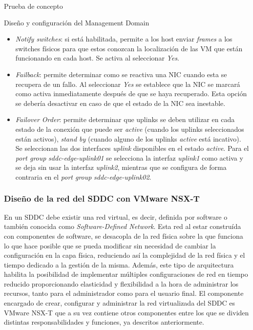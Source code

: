 \begin{section}{Prueba de concepto}
\begin{subsection}{Diseño y configuración del Management Domain}
\begin{itemize}
      \item \textit{Notify switches}: si está habilitada, permite a los host enviar \textit{frames} a los switches físicos para que estos conozcan la localización de las VM que están funcionando en cada host. Se activa al seleccionar \textit{Yes}.
      
      \item \textit{Failback}: permite determinar como se reactiva una NIC cuando esta se recupera de un fallo. Al seleccionar \textit{Yes} se establece que la NIC se marcará como activa inmediatamente después de que se haya recuperado. Esta opción se debería desactivar en caso de que el estado de la NIC sea inestable.
      
      \item \textit{Failover Order}: permite determinar que uplinks se deben utilizar en cada estado de la conexión que puede ser \textit{active} (cuando los uplinks seleccionados están activos), \textit{stand by} (cuando alguno de los uplinks \textit{active} está incativo). Se seleccionan las dos interfaces \textit{uplink} disponibles en el estado \textit{active}. Para el \textit{port group} \textit{sddc-edge-uplink01} se selecciona la interfaz \textit{uplink1} como activa y se deja sin usar la interfaz \textit{uplink2}, mientras que se configura de forma contraria en el \textit{port group} \textit{sddc-edge-uplink02}.
    \end{itemize}
    
    
    \subsubsection{Diseño de la red del SDDC con VMware NSX-T}
    En un SDDC debe existir una red virtual, es decir, definida por software o también conocida como \textit{Software-Defined Network}. Esta red al estar construída con componentes de software, se desacopla de la red física sobre la que funciona lo que hace posible que se pueda modificar sin necesidad de cambiar la configuración en la capa física, reduciendo así la complejidad de la red física y el tiempo dedicado a la gestión de la misma. Además, este tipo de arquitectura habilita la posibilidad de implementar múltiples configuraciones de red en tiempo reducido proporcionando elasticidad y flexibilidad a la hora de administrar los recursos, tanto para el administrador como para el usuario final.
    El componente encargado de crear, configurar y administrar la red virtualizada del SDDC es VMware NSX-T que a su vez contiene otros componentes entre los que se dividen distintas responsabilidades y funciones, ya descritos anteriormente.
    

\end{subsection}
\end{section}
